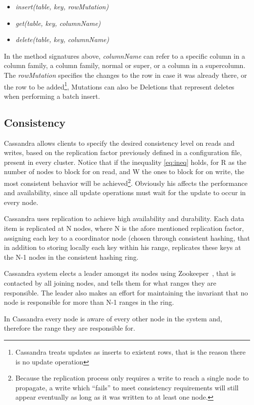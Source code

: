 \begin{itemize}
	\item \emph{insert(table, key, rowMutation)}
	\item \emph{get(table, key, columnName)}
	\item \emph{delete(table, key, columnName)}
\end{itemize}	

In the method signatures above, \emph{columnName} can refer to a specific column in a column family, a column family, normal or super, or a column in a supercolumn. The \emph{rowMutation} specifies the changes to the row in case it was already there, or the row to be added\footnote{Cassandra treats updates as inserts to existent rows, that is the reason there is no update operation}, Mutations can also be Deletions that represent deletes when performing a batch insert.

\subsection{Consistency}
\label{sec:consistency}
Cassandra allows clients to specify the desired consistency level on reads and writes, based on the replication factor previously defined in a configuration file, present in every cluster. Notice that if the inequality \ref{eq:ineq} holds, for R as the number of nodes to block for on read, and W the ones to block for on write, the most consistent behavior will be achieved\footnote{Because the replication process only requires a write to reach a single node to propagate, a write which ``fails'' to meet consistency requirements will still appear eventually as long as it was written to at least one node.}. Obviously his affects the performance and availability, since all update operations must wait for the update to occur in every node.

Cassandra uses replication to achieve high availability and durability. Each data item is replicated at N nodes, where N is the afore mentioned replication factor, assigning each key to a coordinator node (chosen through consistent hashing, that in addition to storing locally each key within his range, replicates these keys at the N-1 nodes in the consistent hashing ring. 

Cassandra system elects a leader amongst its nodes using Zookeeper~\cite{Junqueira2007}, that is contacted by all joining nodes, and tells them for what ranges they are responsible. The leader also makes an effort for maintaining the invariant that no node is responsible for more than N-1 ranges in the ring. 

In Cassandra every node is aware of every other node in the system and, therefore the range they are responsible for.



